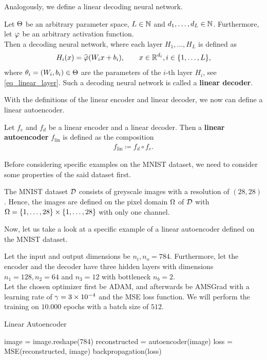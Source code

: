 Analogously, we define a linear decoding neural network.

\begin{definition}\label{def_linear_decoder}
Let $\operatorname{\Theta}$ be an arbitrary parameter space, $L\in \operatorname{\mathbb{N}}$ and $d_1,\ldots,d_L \in \operatorname{\mathbb{N}}$. Furthermore, let $\operatorname{\varphi}$ be an arbitrary activation function.\\
Then a decoding neural network, where each layer $H_1,\ldots, H_L$ is defined as
\begin{align*}
H_i(x) = \widehat{\operatorname{\varphi}}(W_ix + b_i), \qquad x \in \operatorname{\mathbb{R}}^{d_i}, i \in \{1,\ldots, L\},
\end{align*}
where $\theta_i=(W_i, b_i)\in\operatorname{\Theta}$ are the parameters of the $i$-th layer $H_i$, see \eqref{eq_linear_layer}. Such a decoding neural network is called a \textbf{linear decoder}.
\end{definition}


With the definitions of the linear encoder and linear decoder, we now can define a linear autoencoder.


\begin{definition}
Let $f_e$ and $f_d$ be a linear encoder and a linear decoder. Then a \textbf{linear autoencoder} $f_{\text{lin}}$ is defined as the composition
\begin{align*}
f_{\text{lin}} \coloneqq f_d \circ f_e.
\end{align*}
\end{definition}

Before considering specific examples on the MNIST dataset, we need to consider some properties of the said dataset first.

\begin{proposition}\label{def:mnist}
The MNIST dataset $\operatorname{\mathcal{D}}$ consists of greyscale images with a resolution of $(28,28)$. Hence, the images are defined on the pixel domain $\Omega$ of $\operatorname{\mathcal{D}}$ with $\Omega=\{1,\ldots,28\}\times\{1,\ldots,28\}$ with only one channel.
\end{proposition}

Now, let us take a look at a specific example of a linear autoencoder defined on the MNIST dataset.

\begin{algorithm}
Let the input and output dimensions be $n_i, n_o = 784$. Furthermore, let the encoder and the decoder have three hidden layers with dimensions $n_1 = 128, n_2=64$ and $n_3 = 12$ with bottleneck $n_b = 2$.\\
Let the chosen optimizer first be ADAM, and afterwards be AMSGrad with a learning rate of $\operatorname{\gamma}=\num{3e-4}$ and the MSE loss function. We will perform the training on $10.000$ epochs with a batch size of $512$.
\caption{Linear Autoencoder}\label{alg:linAE_2d}
\begin{algorithmic}[1]
		\State image = image.reshape(784) 
	    \State reconstructed = autoencoder(image) 
    	\State loss = MSE(reconstructed, image) 
	    \State backpropagation(loss) 
    \EndFor
\EndFor
\end{algorithmic}
\end{algorithm}

